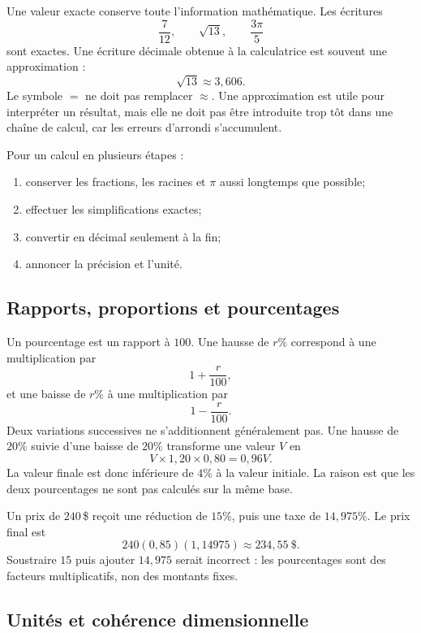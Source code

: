 Une valeur exacte conserve toute l'information mathématique. Les écritures
\[
\frac{7}{12},\qquad \sqrt{13},\qquad \frac{3\pi}{5}
\]
sont exactes. Une écriture décimale obtenue à la calculatrice est souvent une approximation :
\[
\sqrt{13}\approx3{,}606.
\]
Le symbole $=$ ne doit pas remplacer $\approx$. Une approximation est utile pour interpréter un résultat, mais elle ne doit pas être introduite trop tôt dans une chaîne de calcul, car les erreurs d'arrondi s'accumulent.

\begin{methodbox}
Pour un calcul en plusieurs étapes :
\begin{enumerate}
\item conserver les fractions, les racines et $\pi$ aussi longtemps que possible;
\item effectuer les simplifications exactes;
\item convertir en décimal seulement à la fin;
\item annoncer la précision et l'unité.
\end{enumerate}
\end{methodbox}

\subsection{Rapports, proportions et pourcentages}

Un pourcentage est un rapport à $100$. Une hausse de $r\%$ correspond à une multiplication par
\[
1+\frac r{100},
\]
et une baisse de $r\%$ à une multiplication par
\[
1-\frac r{100}.
\]
Deux variations successives ne s'additionnent généralement pas. Une hausse de $20\%$ suivie d'une baisse de $20\%$ transforme une valeur $V$ en
\[
V\times1{,}20\times0{,}80=0{,}96V.
\]
La valeur finale est donc inférieure de $4\%$ à la valeur initiale. La raison est que les deux pourcentages ne sont pas calculés sur la même base.

\begin{examplebox}
Un prix de $240\,$\$ reçoit une réduction de $15\%$, puis une taxe de $14{,}975\%$. Le prix final est
\[
240(0{,}85)(1{,}14975)\approx234{,}55\ \$.
\]
Soustraire $15$ puis ajouter $14{,}975$ serait incorrect : les pourcentages sont des facteurs multiplicatifs, non des montants fixes.
\end{examplebox}

\subsection{Unités et cohérence dimensionnelle}

